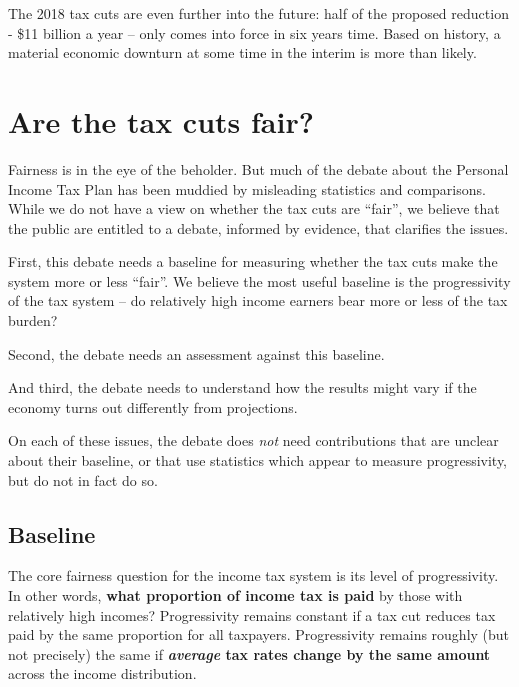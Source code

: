 \documentclass[submission]{grattan}\usepackage[]{graphicx}\usepackage[]{color}
\begin{document}
The 2018 tax cuts are even further into the future: half of the proposed reduction - \$11 billion a year -- only comes into force in six years time. Based on history, a material economic downturn at some time in the interim is more than likely.

\chapter{}\label{chap:section-1}

\chapter{Are the tax cuts fair?}\label{chap:are-the-tax-cuts-fair}

Fairness is in the eye of the beholder. But much of the debate about the Personal Income Tax Plan has been muddied by misleading statistics and comparisons. While we do not have a view on whether the tax cuts are ``fair'', we believe that the public are entitled to a debate, informed by evidence, that clarifies the issues.

First, this debate needs a baseline for measuring whether the tax cuts make the system more or less ``fair''. We believe the most useful baseline is the progressivity of the tax system -- do relatively high income earners bear more or less of the tax burden?

Second, the debate needs an assessment against this baseline.

And third, the debate needs to understand how the results might vary if the economy turns out differently from projections.

On each of these issues, the debate does \emph{not} need contributions that are unclear about their baseline, or that use statistics which appear to measure progressivity, but do not in fact do so.

\section{Baseline }\label{sec:baseline}

The core fairness question for the income tax system is its level of progressivity. In other words, \textbf{what proportion of income tax is paid} by those with relatively high incomes? Progressivity remains constant if a tax cut reduces tax paid by the same proportion for all taxpayers. Progressivity remains roughly (but not precisely) the same if \textbf{\emph{average} tax rates change by the same amount} across the income distribution.
\end{document}
